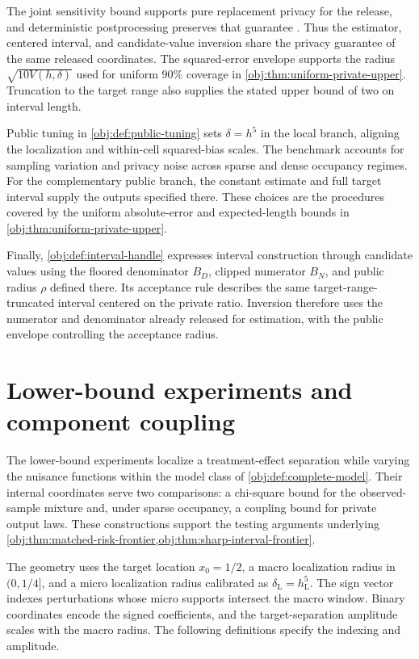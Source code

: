 \documentclass[11pt]{article}
\begin{document}
The joint sensitivity bound supports pure replacement privacy for the release, and deterministic postprocessing preserves that guarantee \citep[Theorem 3.6 and Proposition 2.1]{Dwork2014}. Thus the estimator, centered interval, and candidate-value inversion share the privacy guarantee of the same released coordinates. The squared-error envelope supports the radius \(\sqrt{10V(h,\delta)}\) used for uniform \(90\%\) coverage in \cref{obj:thm:uniform-private-upper}. Truncation to the target range also supplies the stated upper bound of two on interval length.

Public tuning in \cref{obj:def:public-tuning} sets \(\delta=h^5\) in the local branch, aligning the localization and within-cell squared-bias scales. The benchmark accounts for sampling variation and privacy noise across sparse and dense occupancy regimes. For the complementary public branch, the constant estimate and full target interval supply the outputs specified there. These choices are the procedures covered by the uniform absolute-error and expected-length bounds in \cref{obj:thm:uniform-private-upper}.

Finally, \cref{obj:def:interval-handle} expresses interval construction through candidate values using the floored denominator \(B_D\), clipped numerator \(B_N\), and public radius \(\rho\) defined there. Its acceptance rule describes the same target-range-truncated interval centered on the private ratio. Inversion therefore uses the numerator and denominator already released for estimation, with the public envelope controlling the acceptance radius.


\section{Lower-bound experiments and component coupling}

The lower-bound experiments localize a treatment-effect separation while varying the nuisance functions within the model class of \cref{obj:def:complete-model}. Their internal coordinates serve two comparisons: a chi-square bound for the observed-sample mixture and, under sparse occupancy, a coupling bound for private output laws. These constructions support the testing arguments underlying \cref{obj:thm:matched-risk-frontier,obj:thm:sharp-interval-frontier}.

The geometry uses the target location \(x_0=1/2\), a macro localization radius  in \((0,1/4]\), and a micro localization radius  calibrated as \(\delta_{\mathrm L}=h_{\mathrm L}^{5}\). The sign vector  indexes perturbations whose micro supports intersect the macro window. Binary coordinates encode the signed coefficients, and the target-separation amplitude  scales with the macro radius. The following definitions specify the indexing and amplitude.
\end{document}
